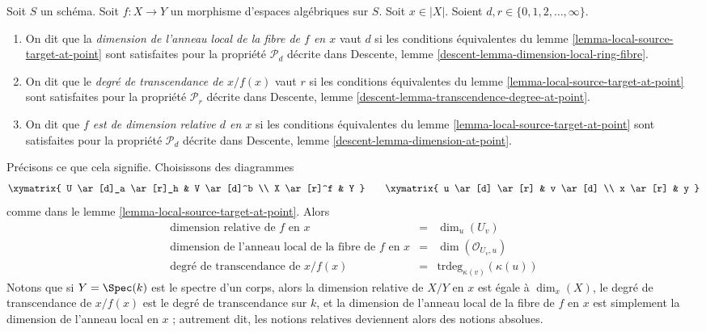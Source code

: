 \begin{definition}
\label{definition-dimension-fibre}
Soit $S$ un schéma.
Soit $f : X \to Y$ un morphisme d'espaces algébriques sur $S$.
Soit $x \in |X|$.
Soient $d, r \in \{0, 1, 2, \ldots, \infty\}$.
\begin{enumerate}
\item On dit que la
{\it dimension de l'anneau local de la fibre de $f$ en $x$} vaut $d$
si les conditions équivalentes du
lemme \ref{lemma-local-source-target-at-point}
sont satisfaites pour la propriété
$\mathcal{P}_d$ décrite dans
Descente, lemme \ref{descent-lemma-dimension-local-ring-fibre}.
\item On dit que le
{\it degré de transcendance de $x/f(x)$} vaut $r$
si les conditions équivalentes du
lemme \ref{lemma-local-source-target-at-point}
sont satisfaites pour la propriété
$\mathcal{P}_r$ décrite dans
Descente, lemme \ref{descent-lemma-transcendence-degree-at-point}.
\item On dit que
{\it $f$ est de dimension relative $d$ en $x$}
si les conditions équivalentes du
lemme \ref{lemma-local-source-target-at-point}
sont satisfaites pour la propriété
$\mathcal{P}_d$ décrite dans
Descente, lemme \ref{descent-lemma-dimension-at-point}.
\end{enumerate}
\end{definition}

\noindent
Précisons ce que cela signifie. Choisissons des
diagrammes
$$
\xymatrix{
U \ar[d]_a \ar[r]_h & V \ar[d]^b \\
X \ar[r]^f & Y
}
\quad\quad
\xymatrix{
u \ar[d] \ar[r] & v \ar[d] \\
x \ar[r] & y
}
$$
comme dans le
lemme \ref{lemma-local-source-target-at-point}.
Alors
$$
\begin{matrix}
\text{dimension relative de }f\text{ en }x & = &
\dim_u (U_v) \\
\text{dimension de l'anneau local de la fibre de }f\text{ en }x & = &
\dim(\mathcal{O}_{U_v, u})\\
\text{degré de transcendance de }x/f(x) & = &
\text{trdeg}_{\kappa(v)}(\kappa(u))
\end{matrix}
$$
Notons que si $Y = \Spec(k)$ est le spectre d'un corps, alors
la dimension relative de $X/Y$ en $x$ est égale à $\dim_x(X)$,
le degré de transcendance de $x/f(x)$ est le degré de transcendance
sur $k$, et la dimension de l'anneau local de la fibre de $f$
en $x$ est simplement la dimension de l'anneau local en $x$ ; autrement dit, les
notions relatives deviennent alors des notions absolues.

